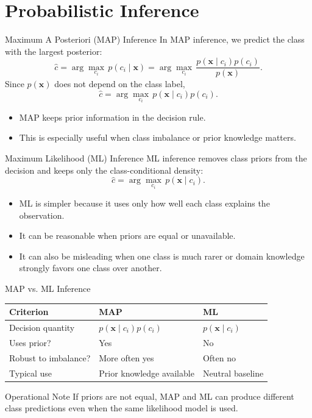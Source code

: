 \documentclass[10pt]{beamer}
\begin{document}
\section{Probabilistic Inference}

\begin{frame}{Maximum A Posteriori (MAP) Inference}
  \justifying
  In MAP inference, we predict the class with the largest posterior:
  \[
    \hat{c} = \arg\max_{c_i} \, p(c_i\mid\bm{x})
    = \arg\max_{c_i} \, \frac{p(\bm{x}\mid c_i)p(c_i)}{p(\bm{x})}.
  \]
  Since $p(\bm{x})$ does not depend on the class label,
  \[
    \hat{c} = \arg\max_{c_i} \, p(\bm{x}\mid c_i)p(c_i).
  \]
  \begin{itemize}
    \item MAP keeps prior information in the decision rule.
    \item This is especially useful when class imbalance or prior knowledge matters.
  \end{itemize}
\end{frame}

\begin{frame}{Maximum Likelihood (ML) Inference}
  \justifying
  ML inference removes class priors from the decision and keeps only the class-conditional density:
  \[
    \hat{c} = \arg\max_{c_i} \, p(\bm{x}\mid c_i).
  \]
  \begin{itemize}
    \item ML is simpler because it uses only how well each class explains the observation.
    \item It can be reasonable when priors are equal or unavailable.
    \item It can also be misleading when one class is much rarer or domain knowledge strongly favors one class over another.
  \end{itemize}
\end{frame}

\begin{frame}{MAP vs. ML Inference}
  \justifying
  \begin{table}[ht]
    \centering
    \begin{tabular}{p{}p{}p{}}
      \toprule
      Criterion & MAP & ML \\
      \midrule
      Decision quantity & $p(\bm{x}\mid c_i)p(c_i)$ & $p(\bm{x}\mid c_i)$ \\
      Uses prior? & Yes & No \\
      Robust to imbalance? & More often yes & Often no \\
      Typical use & Prior knowledge available & Neutral baseline \\
      \bottomrule
    \end{tabular}
  \end{table}
  \begin{warningbox}{Operational Note}
    If priors are not equal, MAP and ML can produce different class predictions even when the same likelihood model is used.
  \end{warningbox}
\end{frame}
\end{document}
